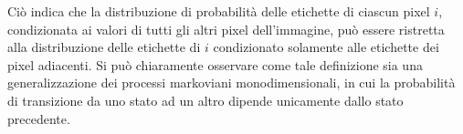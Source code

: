 Ciò indica che la distribuzione di probabilità delle etichette di ciascun pixel $i$, condizionata ai valori di tutti gli altri pixel dell'immagine, può essere ristretta alla distribuzione delle etichette di $i$ condizionato solamente alle etichette dei pixel adiacenti. Si può chiaramente osservare come tale definizione sia una generalizzazione dei processi markoviani monodimensionali, in cui la probabilità di transizione da uno stato ad un altro dipende unicamente dallo stato precedente.
   

%
%
%
%
%
%

